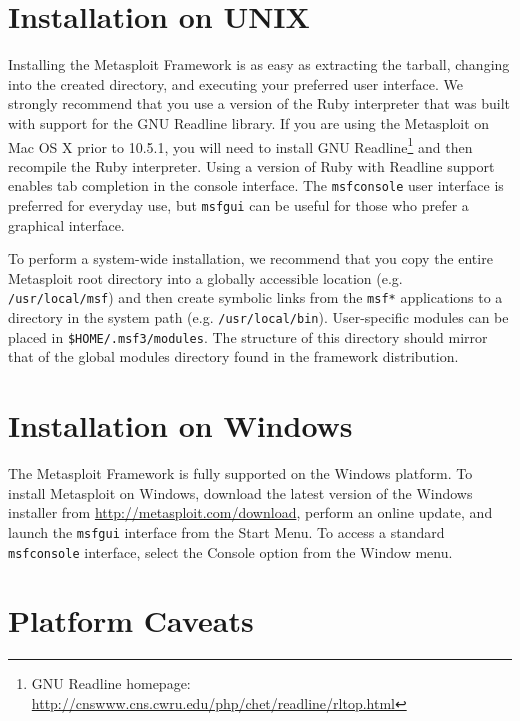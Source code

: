 \documentclass{report}
\begin{document}
    \section{Installation on UNIX}
    \label{INSTALL-UNIX}

\par
Installing the Metasploit Framework is as easy as extracting the tarball,
changing into the created directory, and executing your preferred user
interface. We strongly recommend that you use a version of the Ruby interpreter
that was built with support for the GNU Readline library. If you are using the
Metasploit on Mac OS X prior to 10.5.1, you will need to install GNU
Readline\footnote{GNU Readline homepage:
\url{http://cnswww.cns.cwru.edu/php/chet/readline/rltop.html}} and then
recompile the Ruby interpreter. Using a version of Ruby with Readline support
enables tab completion in the console interface. The \texttt{msfconsole} user
interface is preferred for everyday use, but \texttt{msfgui} can be useful for
those who prefer a graphical interface.

\par
To perform a system-wide installation, we recommend that you copy the entire
Metasploit root directory into a globally accessible location (e.g.
\texttt{/usr/local/msf}) and then create symbolic links from the \texttt{msf*}
applications to a directory in the system path (e.g. \texttt{/usr/local/bin}).
User-specific modules can be placed in \texttt{\$HOME/.msf3/modules}. The
structure of this directory should mirror that of the global modules directory
found in the framework distribution.

    \section{Installation on Windows}
    \label{INSTALL-WIN32}

\par
The Metasploit Framework is fully supported on the Windows platform. To install
Metasploit on Windows, download the latest version of the Windows installer from
\url{http://metasploit.com/download}, perform an online update, and launch the
\texttt{msfgui} interface from the Start Menu. To access a standard
\texttt{msfconsole} interface, select the Console option from the Window menu.

    \section{Platform Caveats}
    \label{INSTALL-CAVEAT}
\end{document}
